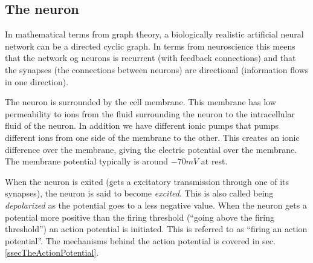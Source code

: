 
\subsection{The neuron}
\label{ssecTheNeuron}
In mathematical terms from graph theory, a biologically realistic artificial neural network can be a directed cyclic graph. 
In terms from neuroscience this meens that the network og neurons is recurrent (with feedback connections) and that the synapses (the connections between neurons) are directional (information flows in one direction). 


The neuron is surrounded by the cell membrane. This membrane has low permeability to ions from the fluid surrounding the neuron to the intracellular fluid of the neuron.
In addition we have different ionic pumps that pumps different ions from one side of the membrane to the other. This creates an ionic difference over the membrane, giving the electric potential over the membrane.
The membrane potential typically is around $-70mV$ at rest.


When the neuron is exited (gets a excitatory transmission through one of its synapses), the neuron is said to become \emph{excited}. 
This is also called being \emph{depolarized} as the potential goes to a less negative value. 
When the neuron gets a potential more positive than the firing threshold (``going above the firing threshold'') an action potential is initiated.
This is referred to as ``firing an action potential''.
The mechanisms behind the action potential is covered in sec. \ref{ssecTheActionPotential}.

